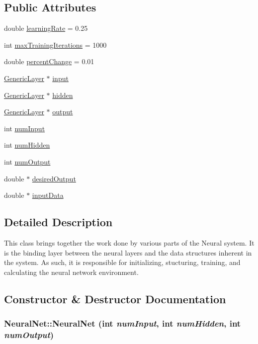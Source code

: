 \subsection*{Public Attributes}
\begin{CompactItemize}
\item 
double \hyperlink{classNeuralNet_dbc3025a07c81b26fddcc6f376f69cd1}{learningRate} = 0.25
\item 
int \hyperlink{classNeuralNet_48dd706c84da839dca865eae8cdffc5e}{maxTrainingIterations} = 1000
\item 
double \hyperlink{classNeuralNet_a8329b04a9c709b1b508b06dbec234bd}{percentChange} = 0.01
\item 
\hyperlink{classGenericLayer}{GenericLayer} $\ast$ \hyperlink{classNeuralNet_a254ed58d525fb163fe78e8ad2013d5e}{input}
\item 
\hyperlink{classGenericLayer}{GenericLayer} $\ast$ \hyperlink{classNeuralNet_b0c566728137bb3bb4c3328005dcb33b}{hidden}
\item 
\hyperlink{classGenericLayer}{GenericLayer} $\ast$ \hyperlink{classNeuralNet_97e58ab98eff78a898e9bb68ebc5be11}{output}
\item 
int \hyperlink{classNeuralNet_d46f938b28b505ef25f9d0a3a256ba78}{numInput}
\item 
int \hyperlink{classNeuralNet_62cfa0d0238baf0239429fbefd63042c}{numHidden}
\item 
int \hyperlink{classNeuralNet_c20e9fd588f7be05e8d658a5b673affe}{numOutput}
\item 
double $\ast$ \hyperlink{classNeuralNet_db3310c1abfe25972101f3a5f9b45d1e}{desiredOutput}
\item 
double $\ast$ \hyperlink{classNeuralNet_a767b858e21d79356577a77f927080fa}{inputData}
\end{CompactItemize}


\subsection{Detailed Description}
This class brings together the work done by various parts of the Neural system. It is the binding layer between the neural layers and the data structures inherent in the system. As such, it is responsible for initializing, stucturing, training, and calculating the neural network environment. 

\subsection{Constructor \& Destructor Documentation}
\hypertarget{classNeuralNet_a7045d229a664d8209a919d93108426a}{
\subsubsection{\setlength{\rightskip}{0pt plus 5cm}NeuralNet::NeuralNet (int {\em numInput}, int {\em numHidden}, int {\em numOutput})}}
\label{classNeuralNet_a7045d229a664d8209a919d93108426a}


